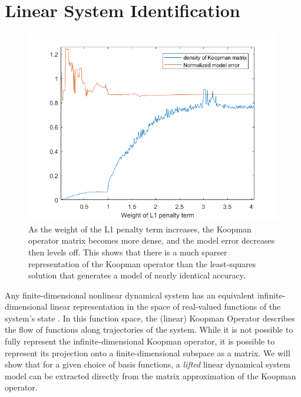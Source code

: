\section{Linear System Identification}
\label{sec:sysid}

\begin{figure}
    \centering
    \includegraphics[width=\linewidth]{figures/lasso_placeholder.png}
    \caption{As the weight of the L1 penalty term increases, the Koopman operator matrix becomes more dense, and the model error decreases then levels off. This shows that there is a much sparser representation of the Koopman operator than the least-squares solution that generates a model of nearly identical accuracy.}
    \label{fig:lasso}
\end{figure}


Any finite-dimensional nonlinear dynamical system has an equivalent infinite-dimensional linear representation in the space of real-valued functions of the system's state \cite{mauroy2016linear}.
In this function space, the (linear) Koopman Operator describes the flow of functions along trajectories of the system.
While it is not possible to fully represent the infinite-dimensional Koopman operator, it is possible to represent its projection onto a finite-dimensional subspace as a matrix.
We will show that for a given choice of basis functions, a \emph{lifted} linear dynamical system model can be extracted directly from the matrix approximation of the Koopman operator.  

